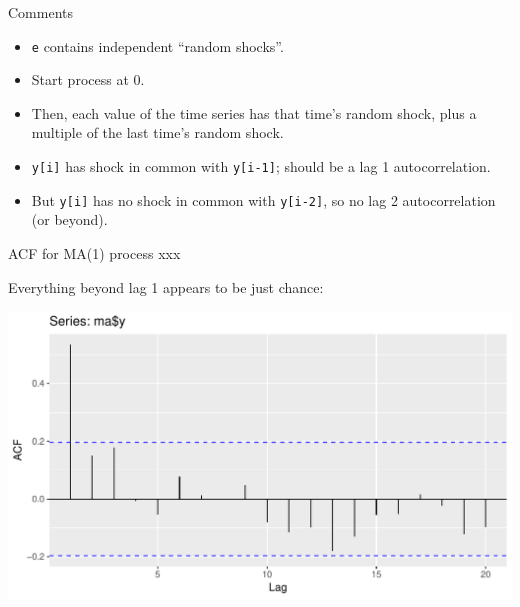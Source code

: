 \documentclass[ignorenonframetext,]{beamer}
\newenvironment{Shaded}{\begin{snugshade}}{\end{snugshade}}
\newcommand{\DataTypeTok}[1]{\textcolor[rgb]{0.13,0.29,0.53}{#1}}
\newcommand{\KeywordTok}[1]{\textcolor[rgb]{0.13,0.29,0.53}{\textbf{#1}}}
\newcommand{\NormalTok}[1]{#1}
\newcommand{\OperatorTok}[1]{\textcolor[rgb]{0.81,0.36,0.00}{\textbf{#1}}}
\newcommand{\StringTok}[1]{\textcolor[rgb]{0.31,0.60,0.02}{#1}}
\providecommand{\tightlist}{%
  \setlength{\itemsep}{0pt}\setlength{\parskip}{0pt}}
\begin{document}
\begin{frame}[fragile]{Comments}
\protect\hypertarget{comments-3}{}

\begin{itemize}
\tightlist
\item
  \texttt{e} contains independent ``random shocks''.
\item
  Start process at 0.
\item
  Then, each value of the time series has that time's random shock, plus
  a multiple of the last time's random shock.
\item
  \texttt{y{[}i{]}} has shock in common with \texttt{y{[}i-1{]}}; should
  be a lag 1 autocorrelation.
\item
  But \texttt{y{[}i{]}} has no shock in common with \texttt{y{[}i-2{]}},
  so no lag 2 autocorrelation (or beyond).
\end{itemize}

\end{frame}

\begin{frame}[fragile]{ACF for MA(1) process xxx}
\protect\hypertarget{acf-for-ma1-process-xxx}{}

Everything beyond lag 1 appears to be just chance:

\begin{Shaded}
\end{Shaded}

\includegraphics{figure/unnamed-chunk-42-1.pdf}

\end{frame}
\end{document}
